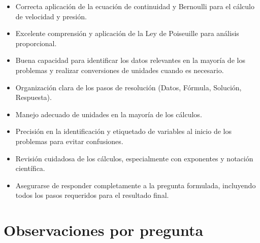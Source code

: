 \documentclass[11pt,a4paper]{article}
\begin{document}
\vspace{4pt}
\begin{minipage}[t]{0.48\linewidth}
  \begin{tcolorbox}[cajaFortaleza, title={Fortalezas}]
\begin{itemize}[leftmargin=1.5em, itemsep=2pt]
  \item Correcta aplicación de la ecuación de continuidad y Bernoulli para el cálculo de velocidad y presión.
  \item Excelente comprensión y aplicación de la Ley de Poiseuille para análisis proporcional.
  \item Buena capacidad para identificar los datos relevantes en la mayoría de los problemas y realizar conversiones de unidades cuando es necesario.
  \item Organización clara de los pasos de resolución (Datos, Fórmula, Solución, Respuesta).
  \item Manejo adecuado de unidades en la mayoría de los cálculos.
\end{itemize}
  \end{tcolorbox}
\end{minipage}
\hfill
\begin{minipage}[t]{0.48\linewidth}
  \begin{tcolorbox}[cajaMejora, title={Areas de mejora}]
\begin{itemize}[leftmargin=1.5em, itemsep=2pt]
  \item Precisión en la identificación y etiquetado de variables al inicio de los problemas para evitar confusiones.
  \item Revisión cuidadosa de los cálculos, especialmente con exponentes y notación científica.
  \item Asegurarse de responder completamente a la pregunta formulada, incluyendo todos los pasos requeridos para el resultado final.
\end{itemize}
  \end{tcolorbox}
\end{minipage}

\section*{Observaciones por pregunta}
\end{document}
